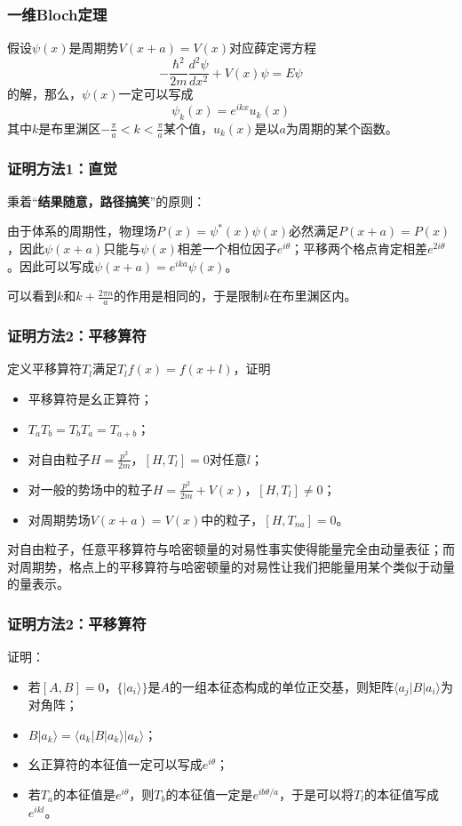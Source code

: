 \documentclass[CJK]{beamer}
\begin{document}
\begin{frame}
\frametitle{\bch 一维Bloch定理 \ech}
\bch
假设$\psi (x) $是周期势$V(x+a) = V(x)$对应薛定谔方程
$$
-\frac{\hbar^2}{2m} \frac{d^2 \psi}{dx^2} + V(x) \psi = E \psi
$$
的解，那么，$\psi (x)$一定可以写成
$$
\psi_k(x) = e^{ikx} u_k(x)
$$
其中$k$是布里渊区$-\frac{\pi}{a} < k < \frac{\pi}{a}$某个值，$u_k(x)$是以$a$为周期的某个函数。
\ech
\end{frame}


\begin{frame}
\frametitle{\bch 证明方法1：直觉 \ech}
\bch
秉着“{\bf 结果随意，路径搞笑}”的原则：\par
由于体系的周期性，物理场$P(x) = \psi^*(x) \psi(x)$必然满足$P(x+a) = P(x)$，因此$\psi(x+a)$只能与$\psi(x)$相差一个相位因子$e^{i\theta}$；平移两个格点肯定相差$e^{2i\theta}$。因此可以写成$\psi(x+a) = e^{ika} \psi(x)$。
\par
可以看到$k$和$k + \frac{2\pi n}{a}$的作用是相同的，于是限制$k$在布里渊区内。
\ech
\end{frame}


\begin{frame}
\frametitle{\bch 证明方法2：平移算符 \ech}
\bch
定义平移算符$T_l$满足$T_l f(x) = f(x+l)$，证明
\begin{itemize}
\item 平移算符是幺正算符；
\item $T_a T_b = T_b T_a = T_{a+b}$；
\item 对自由粒子$H = \frac{p^2}{2m}$，$[H,T_l]=0$对任意$l$；
\item 对一般的势场中的粒子$H = \frac{p^2}{2m} + V(x)$，$[H,T_l] \not= 0$；
\item 对周期势场$V(x+a) = V(x)$中的粒子，$[H,T_{na}] = 0$。
\end{itemize}
对自由粒子，任意平移算符与哈密顿量的对易性事实使得能量完全由动量表征；而对周期势，格点上的平移算符与哈密顿量的对易性让我们把能量用某个类似于动量的量表示。
\ech
\end{frame}

\begin{frame}
\frametitle{\bch 证明方法2：平移算符 \ech}
\bch
证明：
\begin{itemize}
\item 若$[A,B]=0$，$\{|a_i\rangle\}$是$A$的一组本征态构成的单位正交基，则矩阵$\langle a_j | B | a_i \rangle$为对角阵；
\item $B | a_k \rangle = \langle a_k | B | a_k \rangle | a_k \rangle$；
\item 幺正算符的本征值一定可以写成$e^{i\theta}$；
\item 若$T_a$的本征值是$e^{i\theta}$，则$T_{b}$的本征值一定是$e^{ib\theta/a}$，于是可以将$T_l$的本征值写成$e^{ikl}$。
\end{itemize}
\ech
\end{frame}
\end{document}
